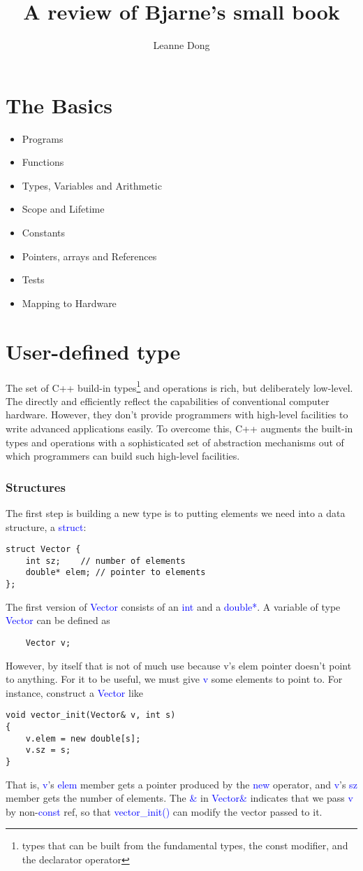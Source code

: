 \documentclass{article}
\title{A review of Bjarne's small book}
\author{Leanne Dong}
\newcommand{\be}[1]{\textcolor{blue}{#1}}
\begin{document}
	\maketitle
	\tableofcontents
\section{The Basics}
\begin{itemize}
	\item Programs
	\item Functions
	\item Types, Variables and Arithmetic
	\item Scope and Lifetime
	\item Constants
	\item Pointers, arrays and References
	\item Tests
	\item Mapping to Hardware
\end{itemize}
\section{User-defined type}
The set of C++ build-in types\footnote{types that can be built from the fundamental types, the const modifier, and the declarator operator} and operations is rich, but deliberately low-level. The directly and efficiently reflect the capabilities of conventional computer hardware. However, they don't provide programmers with high-level facilities to write advanced applications easily. To overcome this, C++ augments the built-in types and operations with a sophisticated set of abstraction mechanisms out of which programmers can build such high-level facilities.

\subsubsection{Structures}

The first step is building a new type is to putting elements we need into a data structure, a \be{struct}:

\begin{verbatim}
struct Vector {
    int sz;    // number of elements
    double* elem; // pointer to elements
};	
\end{verbatim}
The first version of \be{Vector} consists of an \be{int} and a \be{double*}. A variable of type \be{Vector} can be defined as 
\begin{verbatim}
	Vector v;
\end{verbatim}
However, by itself that is not of much use because v's elem pointer doesn't point to anything. For it to be useful, we must give \be{v} some elements to point to. For instance, construct a \be{Vector} like
\begin{verbatim}
void vector_init(Vector& v, int s)
{
    v.elem = new double[s];
    v.sz = s;
}	
\end{verbatim}
That is, \be{v}'s \be{elem} member gets a pointer produced by the \be{new} operator, and \be{v}'s \be{sz} member gets the number of elements. The \be{\&} in \be{Vector\&} indicates that we pass \be{v} by non-\be{const} ref, so that \be{vector\_init()} can modify the vector passed to it.
\end{document}
